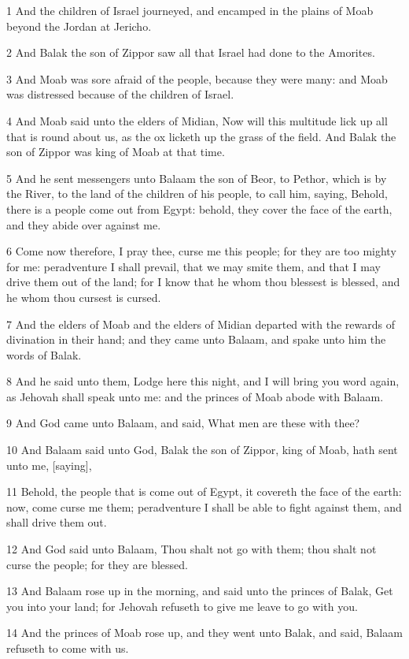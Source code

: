 \par 1 And the children of Israel journeyed, and encamped in the plains of Moab beyond the Jordan at Jericho.
\par 2 And Balak the son of Zippor saw all that Israel had done to the Amorites.
\par 3 And Moab was sore afraid of the people, because they were many: and Moab was distressed because of the children of Israel.
\par 4 And Moab said unto the elders of Midian, Now will this multitude lick up all that is round about us, as the ox licketh up the grass of the field. And Balak the son of Zippor was king of Moab at that time.
\par 5 And he sent messengers unto Balaam the son of Beor, to Pethor, which is by the River, to the land of the children of his people, to call him, saying, Behold, there is a people come out from Egypt: behold, they cover the face of the earth, and they abide over against me.
\par 6 Come now therefore, I pray thee, curse me this people; for they are too mighty for me: peradventure I shall prevail, that we may smite them, and that I may drive them out of the land; for I know that he whom thou blessest is blessed, and he whom thou cursest is cursed.
\par 7 And the elders of Moab and the elders of Midian departed with the rewards of divination in their hand; and they came unto Balaam, and spake unto him the words of Balak.
\par 8 And he said unto them, Lodge here this night, and I will bring you word again, as Jehovah shall speak unto me: and the princes of Moab abode with Balaam.
\par 9 And God came unto Balaam, and said, What men are these with thee?
\par 10 And Balaam said unto God, Balak the son of Zippor, king of Moab, hath sent unto me, [saying],
\par 11 Behold, the people that is come out of Egypt, it covereth the face of the earth: now, come curse me them; peradventure I shall be able to fight against them, and shall drive them out.
\par 12 And God said unto Balaam, Thou shalt not go with them; thou shalt not curse the people; for they are blessed.
\par 13 And Balaam rose up in the morning, and said unto the princes of Balak, Get you into your land; for Jehovah refuseth to give me leave to go with you.
\par 14 And the princes of Moab rose up, and they went unto Balak, and said, Balaam refuseth to come with us.
